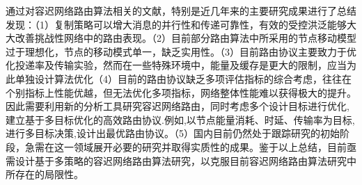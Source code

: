 通过对容迟网络路由算法相关的文献，特别是近几年来的主要研究成果进行了总结发现：（1）复制策略可以增大消息的并行性和传递可靠性，有效的受控洪泛能够大大改善挑战性网络中的路由表现。（2）目前部分路由算法中所采用的节点移动模型过于理想化，节点的移动模式单一，缺乏实用性。（3）目前路由协议主要致力于优化投递率及传输实验，然而在一些特殊环境中，能量及缓存是更大的限制，应当为此单独设计算法优化（4）目前的路由协议缺乏多项评估指标的综合考虑，往往在个别指标上性能优越，但无法优化多项指标，网络整体性能难以获得极大的提升。因此需要利用新的分析工具研究容迟网络路由，同时考虑多个设计目标进行优化,建立基于多目标优化的高效路由协议.例如,以节点能量消耗、时延、传输率为目标,进行多目标决策,设计出最优路由协议。（5）国内目前仍然处于跟踪研究的初始阶段，急需在这一领域展开必要的研究并取得实质性的成果。鉴于以上总结，目前亟需设计基于多策略的容迟网络路由算法研究，以克服目前容迟网络路由算法研究中所存在的局限性。 
